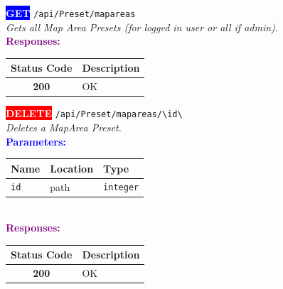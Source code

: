 \begin{tcolorbox}[
    colback=blue!5,
    colframe=blue,
    arc=2mm,
    boxrule=1pt,
    left=5pt,
    right=5pt,
    top=5pt,
    bottom=5pt
]
\noindent\colorbox{blue}{\textcolor{white}{\textbf{GET}}} 
\texttt{\large /api/Preset/mapareas}\\[0.3em]
\textit{Gets all Map Area Presets (for logged in user or all if admin).}\\[0.3em]
\vspace{0.3em}
\textbf{\textcolor{purple}{Responses:}}\\[0.2em]
\begin{tabular}{|c|p{10cm}|}
\hline
\rowcolor{gray!20}
\textbf{Status Code} & \textbf{Description} \\ \hline
\colorbox{green!20}{\textbf{200}} & OK \\ \hline
\end{tabular}
\end{tcolorbox}
\vspace{0.5em}

\begin{tcolorbox}[
    colback=red!5,
    colframe=red,
    arc=2mm,
    boxrule=1pt,
    left=5pt,
    right=5pt,
    top=5pt,
    bottom=5pt
]
\noindent\colorbox{red}{\textcolor{white}{\textbf{DELETE}}} 
\texttt{\large /api/Preset/mapareas/\textbackslash{}{id\textbackslash{}}}\\[0.3em]
\textit{Deletes a MapArea Preset.}\\[0.3em]
\vspace{0.3em}
\textbf{\textcolor{blue}{Parameters:}}\\[0.2em]
\begin{tabular}{|l|l|l|}
\hline
\rowcolor{gray!20}
\textbf{Name} & \textbf{Location} & \textbf{Type} \\ \hline
\texttt{id} & path & \texttt{integer} \\ \hline
\end{tabular}\\[0.5em]
\vspace{0.3em}
\textbf{\textcolor{purple}{Responses:}}\\[0.2em]
\begin{tabular}{|c|p{10cm}|}
\hline
\rowcolor{gray!20}
\textbf{Status Code} & \textbf{Description} \\ \hline
\colorbox{green!20}{\textbf{200}} & OK \\ \hline
\end{tabular}
\end{tcolorbox}
\vspace{0.5em}

